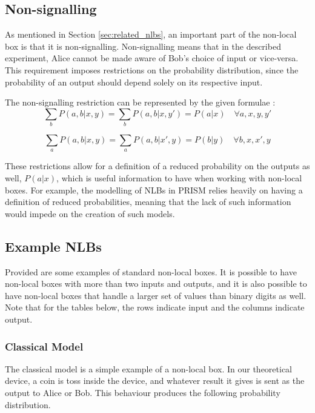 \documentclass[report.tex]{subfiles}
\begin{document}
\subsection{Non-signalling} %
\label{sub:non_signalling}
As mentioned in Section \ref{sec:related_nlbs}, an important part of the
non-local box is that it is non-signalling. Non-signalling means that in the
described experiment, Alice cannot be made aware of Bob's choice of input or
vice-versa. This requirement imposes restrictions on the probability
distribution, since the probability of an output should depend solely on its
respective input. 

The non-signalling restriction can be represented by the given formulae
\cite[Section~II.A]{PhysRevA.71.022101}:
\begin{equation} \label{eq:non-signal_1}
\sum_{b} P(a, b | x, y) = \sum_{b} P(a, b | x, y') = P(a | x) 
\quad \forall a, x, y, y'
\end{equation}

\begin{equation} \label{eq:non-signal_2}
\sum_{a} P(a, b | x, y) = \sum_{a} P(a, b | x', y) = P(b | y) 
\quad \forall b, x, x', y
\end{equation}

These restrictions allow for a definition of a reduced probability on the
outputs as well, \(P(a | x)\), which is useful information to have when
working with non-local boxes. For example, the modelling of NLBs in PRISM relies
heavily on having a definition of reduced probabilities, meaning that the lack
of such information would impede on the creation of such models.

\subsection{Example NLBs} %
\label{sub:example_nlbs}
Provided are some examples of standard non-local boxes. It is possible to have
non-local boxes with more than two inputs and outputs, and it is also possible
to have non-local boxes that handle a larger set of values than binary digits
as well. Note that for the tables below, the rows indicate input and the columns
indicate output.

\subsubsection{Classical Model} %
\label{ssub:classical_model}
The classical model is a simple example of a non-local box. In our theoretical
device, a coin is toss inside the device, and whatever result it gives is sent
as the output to Alice or Bob. This behaviour produces the following probability
distribution.
\end{document}
